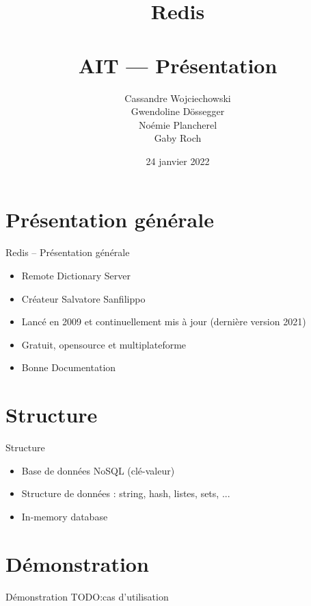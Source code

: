 \documentclass[aspectratio=169]{beamer}
\title{Redis\\~\\AIT --- Présentation}
\author{Cassandre Wojciechowski \\ Gwendoline Dössegger \\ Noémie Plancherel \\ Gaby Roch}
\date{24 janvier 2022}
\newcommand{\TODO}{TODO:}
\begin{document}
\begin{frame}
  \titlepage
\end{frame}
\begin{frame}
  \tableofcontents
\end{frame}

\section{Présentation générale}
\begin{frame}{Redis -- Présentation générale}
 \begin{itemize}
  \item Remote Dictionary Server
  \item Créateur Salvatore Sanfilippo
  \item Lancé en 2009 et continuellement mis à jour (dernière version 2021)
  \item Gratuit, opensource et multiplateforme
  \item Bonne Documentation
 \end{itemize}
\end{frame}

\section{Structure}
\begin{frame}{Structure}
\begin{itemize}
  \item Base de données NoSQL (clé-valeur)
  \item Structure de données : string, hash, listes, sets, ...
  \item In-memory database
\end{itemize}
\end{frame}

\section{Démonstration}
\begin{frame}{Démonstration}
\TODO cas d'utilisation
\end{frame}
\end{document}
